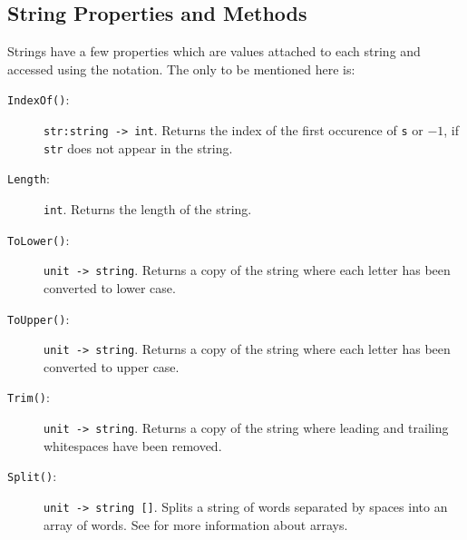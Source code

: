\documentclass[fsharpnotes.tex]{subfiles}
\begin{document}
\subsection{String Properties and Methods}
Strings have a few properties which are values attached to each string and accessed using the  notation. The only to be mentioned here is:
\begin{description}
\item[\texttt{IndexOf()}:] \lstinline{str:string -> int}. Returns the index of the first occurence of \lstinline{s} or $-1$, if \lstinline{str} does not appear in the string.
\item[\texttt{Length}:] \lstinline{int}. Returns the length of the string.
\item[\texttt{ToLower()}:] \lstinline{unit -> string}. Returns a copy of the string where each letter has been converted to lower case.
\item[\texttt{ToUpper()}:] \lstinline{unit -> string}. Returns a copy of the string where each letter has been converted to upper case.
\item[\texttt{Trim()}:] \lstinline{unit -> string}. Returns a copy of the string where leading and trailing whitespaces have been removed.
\item[\texttt{Split()}:] \lstinline{unit -> string []}. Splits a string of words separated by spaces into an array of words. See  for more information about arrays.
\end{description}
\end{document}
